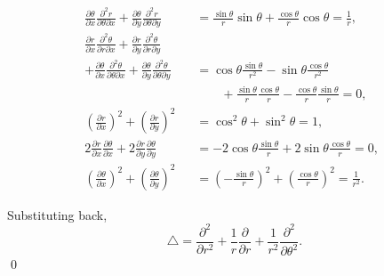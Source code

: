 \documentclass[oneside]{article}
\newcommand*\Laplace{\mathop{}\!\mathbin\bigtriangleup}
\begin{document}
\begin{enumerate}[label=\textbf{\arabic*.}]
\begin{align*}
  \frac{\partial\theta}{\partial x}
        \frac{\partial^2 r}{\partial\theta\partial x}
        + \frac{\partial\theta}{\partial y}
           \frac{\partial^2 r}{\partial\theta\partial y}
  &= \frac{\sin\theta}{r}\sin\theta + \frac{\cos\theta}{r}\cos\theta
  = \frac{1}{r} \text{,}\\
  \frac{\partial r}{\partial x}
      \frac{\partial^2 \theta}{\partial r\partial x}
    + \frac{\partial r}{\partial y}
      \frac{\partial^2 \theta}{\partial r\partial y} \qquad\\
    + \frac{\partial\theta}{\partial x}
      \frac{\partial^2\theta}{\partial\theta\partial x}
    + \frac{\partial\theta}{\partial y}
      \frac{\partial^2\theta}{\partial\theta\partial y}
  &= \cos\theta\frac{\sin\theta}{r^2} - \sin\theta\frac{\cos\theta}{r^2} \\
  &\qquad+\frac{\sin\theta}{r}\frac{\cos\theta}{r} - \frac{\cos\theta}{r}\frac{\sin\theta}{r} = 0
  \text{,}\\
  \left(\frac{\partial r}{\partial x}\right)^2
       + \left(\frac{\partial r}{\partial y}\right)^2
  &= \cos^2\theta + \sin^2\theta = 1\text{,} \\
  2\frac{\partial r}{\partial x}\frac{\partial\theta}{\partial x}
    + 2\frac{\partial r}{\partial y}\frac{\partial\theta}{\partial y}
  &= -2\cos\theta\frac{\sin\theta}{r} + 2 \sin\theta\frac{\cos\theta}{r} = 0
  \text{,}
  \\
  \left(\frac{\partial\theta}{\partial x}\right)^2
    + \left(\frac{\partial\theta}{\partial y}\right)^2
  &= \left(-\frac{\sin\theta}{r}\right)^2 + \left(\frac{\cos\theta}{r}\right)^2
  = \frac{1}{r^2}\text{.}
\end{align*}

Substituting back,\[
  \Laplace = \frac{\partial^2}{\partial r^2}
             + \frac{1}{r}\frac{\partial}{\partial r}
             + \frac{1}{r^2}\frac{\partial^2}{\partial\theta^2} \text{.}
\] \qed


\end{enumerate}
\end{document}
